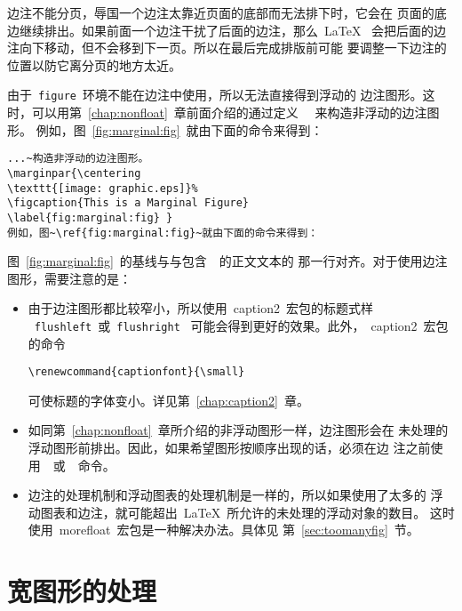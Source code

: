 边注不能分页，辱国一个边注太靠近页面的底部而无法排下时，它会在
页面的底边继续排出。如果前面一个边注干扰了后面的边注，那么~\LaTeX{}~
会把后面的边注向下移动，但不会移到下一页。所以在最后完成排版前可能
要调整一下边注的位置以防它离分页的地方太近。

由于~\texttt{figure}~环境不能在边注中使用，所以无法直接得到浮动的
边注图形。这时，可以用第~\ref{chap:nonfloat}~章前面介绍的通过定义
~~来构造非浮动的边注图形。
例如，图~\ref{fig:marginal:fig}~就由下面的命令来得到：
\begin{Verbatim}[xleftmargin=1cm]
...~构造非浮动的边注图形。
\marginpar{\centering 
\texttt{[image: graphic.eps]}% 
\figcaption{This is a Marginal Figure} 
\label{fig:marginal:fig} }
例如，图~\ref{fig:marginal:fig}~就由下面的命令来得到：
\end{Verbatim}

图~\ref{fig:marginal:fig}~的基线与与包含~~的正文文本的
那一行对齐。对于使用边注图形，需要注意的是：
\begin{itemize}
	\item 由于边注图形都比较窄小，所以使用~\textsf{caption2}~宏包的标题式样
	~\texttt{flushleft}~或~\texttt{flushright}~
	可能会得到更好的效果。此外，~\textsf{caption2}~宏包的命令
	\begin{Verbatim}[xleftmargin=1cm]
	\renewcommand{captionfont}{\small}
	\end{Verbatim}
	可使标题的字体变小。详见第~\ref{chap:caption2}~章。
	\item 如同第~\ref{chap:nonfloat}~章所介绍的非浮动图形一样，边注图形会在
	未处理的浮动图形前排出。因此，如果希望图形按顺序出现的话，必须在边
	注之前使用~~或~~命令。
	\item 边注的处理机制和浮动图表的处理机制是一样的，所以如果使用了太多的
	浮动图表和边注，就可能超出~\LaTeX{}~所允许的未处理的浮动对象的数目。
	这时使用~\textsf{morefloat}~宏包是一种解决办法。具体见
	第~\ref{sec:toomanyfig}~节。
\end{itemize}      

\section{宽图形的处理}

